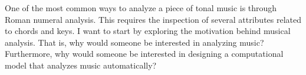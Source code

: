 

One of the most common ways to analyze a piece of tonal
music is through Roman numeral analysis. This requires the
inspection of several attributes related to chords and keys.
I want to start by exploring the motivation behind musical
analysis. That is, why would someone be interested in
analyzing music? Furthermore, why would someone be
interested in designing a computational model that analyzes
music automatically?
